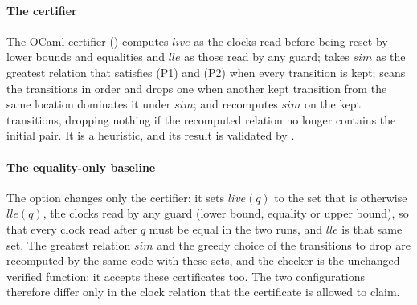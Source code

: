 \paragraph{The certifier} The OCaml certifier () computes $\mathit{live}$ as the clocks read before being reset by lower bounds and equalities and $\mathit{lle}$ as those read by any guard; takes $\mathit{sim}$ as the greatest relation that satisfies (P1) and (P2) when every transition is kept; scans the transitions in order and drops one when another kept transition from the same location dominates it under $\mathit{sim}$; and recomputes $\mathit{sim}$ on the kept transitions, dropping nothing if the recomputed relation no longer contains the initial pair. It is a heuristic, and its result is validated by .

\paragraph{The equality-only baseline} The option  changes only the certifier: it sets $\mathit{live}(q)$ to the set that is otherwise $\mathit{lle}(q)$, the clocks read by any guard (lower bound, equality or upper bound), so that every clock read after $q$ must be equal in the two runs, and $\mathit{lle}$ is that same set. The greatest relation $\mathit{sim}$ and the greedy choice of the transitions to drop are recomputed by the same code with these sets, and the checker  is the unchanged verified function; it accepts these certificates too. The two configurations therefore differ only in the clock relation that the certificate is allowed to claim.

